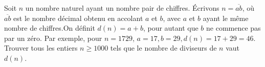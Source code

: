 Soit $n$ un nombre naturel ayant un nombre pair de chiffres. Écrivons $n=\overline{ab}$, où $\overline{ab}$ est le nombre décimal obtenu en accolant $a$ et $b$, avec $a$ et $b$ ayant le même nombre de chiffres.On définit $d(n)=a+b$, pour autant que $b$ ne commence pas par un zéro. Par exemple, pour $n=1729$, $a=17, b=29,d(n)=17+29=46$.
Trouver tous les entiers $n\geq 1000$ tels que le nombre de diviseurs de $n$ vaut $d(n)$.
